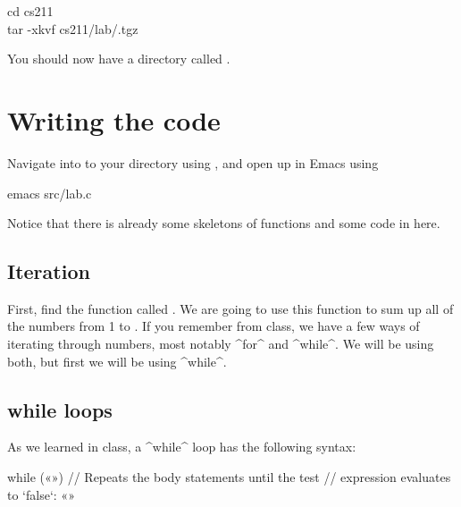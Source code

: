 \documentclass{tufte-handout}
\begin{document}
\begin{CmdLine*}
  \C cd cs211\\
  \C tar -xkvf \plaintilde cs211/lab/\ThisLabBase.tgz\\
\end{CmdLine*}

\noindent
You should now have a directory called
\filename{\ThisLabBase}.

\section{Writing the code}
Navigate into to your \filename{\ThisLabBase} directory using
, and open up  in Emacs using

\begin{CmdLine*}
  \C emacs src/lab.c\\
\end{CmdLine*}

\noindent
Notice that there is already some skeletons of functions and some code
in  here.

\subsection{Iteration}

First, find the function called
. We are going to use this function to sum up all of the numbers
from 1 to .  If you remember from class, we have a few ways
of iterating through numbers, most notably ^for^ and ^while^.  We will
be using both, but first we will be using ^while^.

\subsection{{\codestyleKeyword while} loops} As we learned in class, a  ^while^
loop has the following syntax:


\begin{Code}
    while («») {
        // Repeats the body statements until the test
        // expression evaluates to `false`:
        «»
    }
\end{Code}
\end{document}

